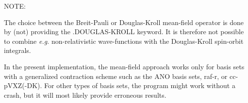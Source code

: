 \begin{description}
NOTE:  

The choice between the Breit-Pauli or Douglas-Kroll mean-field operator 
is done by (not) providing the .DOUGLAS-KROLL keyword. It is therefore 
not possible to combine {\it e.g.\/} non-relativistic wave-functions with the 
Douglas-Kroll spin-orbit integrals. 


In the present implementation, the mean-field approach works only for basis sets 
with a generalized contraction scheme such as the ANO basis sets, raf-r, or cc-pVXZ(-DK).
For other types of basis sets, the program might work without a crash, but it
will most likely provide erroneous results.  



\end{description}



